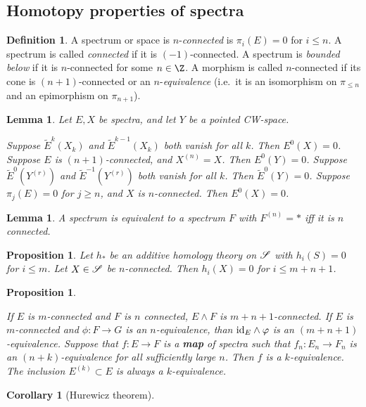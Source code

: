 \documentclass[11pt]{article}
\renewcommand{\comment}{}
\theoremstyle{plain}
\newtheorem{lem}[thm]{Lemma}
\newtheorem{prop}[thm]{Proposition}
\newtheorem{cor}[thm]{Corollary}
\theoremstyle{definition}
\newtheorem{defn}[thm]{Definition}
\begin{document}
\subsection{Homotopy properties of spectra}
\comment{
\setcounter{thm}{3}
\begin{defn}
A spectrum or space is $n$-\emph{connected} is $\pi_i(E)=0$ for $i\leq n$. A
spectrum is called \emph{connected} if it is $(-1)$-connected. A spectrum is
\emph{bounded below} if it is $n$-connected for some $n\in\Z$. A morphism is
called $n$-connected if its cone is $(n+1)$-connected or an
$n$-\emph{equivalence} (i.e.\ it is an isomorphism on $\pi_{\leq n}$ and an
epimorphism on $\pi_{n+1}$).
\end{defn}
\setcounter{thm}{0}
\begin{lem}Let $E,X$ be spectra, and let $Y$ be a pointed CW-space.
\begin{itemise}
\itm[(i)] Suppose $\widetilde E^k(X_k)$ and $\widetilde E^{k-1}(X_k)$ both
vanish for all $k$. Then $E^0(X)=0$.
\itm[(ii)] Suppose $E$ is $(n+1)$-connected, and $X^{(n)}=X$. Then $E^0(Y)=0$.
\itm[(iii)] Suppose $\widetilde E^0(Y^{(r)})$ and $\widetilde E^{-1}(Y^{(r)})$
both vanish for all $k$. Then $\widetilde E^0(Y)=0$.
\itm[(iv)] Suppose $\pi_j(E)=0$ for $j\geq n$, and $X$ is $n$-connected. Then
$E^0(X)=0$.
\end{itemise}
\end{lem}
\begin{lem}
A spectrum is equivalent to a spectrum $F$ with $F^{(n)}=*$ iff it is $n$
connected.
\end{lem}
\begin{prop}
Let $h_*$ be an additive homology theory on $\mathscr{S}$ with $h_i(S)=0$ for $i\leq
m$. Let $X\in\mathscr{S}$ be $n$-connected. Then $h_i(X)=0$ for $i\leq m+n+1$.
\end{prop}
\setcounter{thm}{4}
\begin{prop}\hfil
\begin{itemise}
\itm[(i)] If $E$ is $m$-connected and $F$ is $n$ connected, $E\wedge F$ is
$m+n+1$-connected.
\itm[(ii)] If $E$ is $m$-connected and $\phi:F\to G$ is an $n$-equivalence, than
$\textup{id}_E\wedge \varphi$ is an $(m+n+1)$-equivalence.
\itm[(iii)] Suppose that $f:E\to F$ is a \textbf{map} of spectra such that
$f_n:E_n\to F_n$ is an $(n+k)$-equivalence for all sufficiently large $n$. Then
$f$ is a $k$-equivalence.
\itm[(iv)] The inclusion $E^{(k)}\subset E$ is always a $k$-equivalence.
\end{itemise}
\end{prop}
\begin{cor}[Hurewicz theorem]

\end{cor}}
\end{document}
